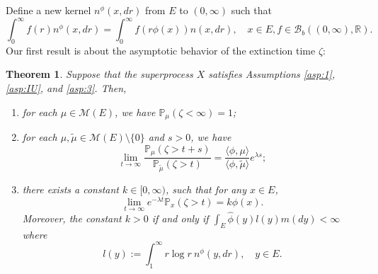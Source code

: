 \documentclass[12pt,a4paper]{amsart}
\numberwithin{equation}{section}
\theoremstyle{plain}
\newtheorem{thm}{Theorem}[section]
\theoremstyle{definition}
\begin{document}
\par
Define a new kernel $n^\phi(x, dr)$ from $E$ to $(0,\infty)$ such that
\begin{equation} \label{eq:phi_change}
	\int_0^\infty f(r)n^\phi(x,dr)=\int_0^\infty f(r\phi(x))n(x, dr),
	\quad x\in E, f\in \mathcal B_b((0,\infty), \mathbb R).
\end{equation}
Our first result is about the asymptotic behavior of the extinction time $\zeta$:

\begin{thm}\label{thm:distribution_of_zeta}
	Suppose that the superprocess $X$ satisfies Assumptions \ref{asp:1},
  \ref{asp:IU}, and \ref{asp:3}. Then,
  \begin{enumerate}
  \item
    \label{subthm:extinct_almost_sure}
    for each $\mu \in \mathcal M(E)$, we have  $\mathbb P_\mu(\zeta<\infty)=1$;
  \item
    for each $\mu,\widetilde\mu\in \mathcal M(E)\setminus\{0\}$ and $s>0$, we have
    \[
      \lim_{t\rightarrow\infty}\dfrac{\mathbb P_{\mu}(\zeta>t+s)}{\mathbb P_{\widetilde\mu}(\zeta>t)}=\frac{\langle \phi,\mu\rangle }{\langle \phi,\widetilde\mu\rangle }e^{\lambda s};
    \]
  \item
  \label{subthm:LlogL}
    there exists a constant $k\in [0,\infty)$, such that for any $x\in E$,
    \begin{equation}\label{eq:decay_rate}
      \lim_{t\rightarrow\infty} e^{-\lambda t}\mathbb P_x(\zeta>t)=k\phi(x).
    \end{equation}
    Moreover, the constant $k>0$ if and only if $\int_E \widehat\phi(y)l(y)m(dy)<\infty$ where
    \begin{equation}\label{eq:m}
      l(y):=\int_1^\infty r\log r~n^\phi(y, dr),\quad y \in E.
    \end{equation}
  \end{enumerate}
\end{thm}

\begin{comment}
In particular, for any $x,y\in E$ and $s\geq 0$, the second result in the above theorem can be written as
\begin{equation}\label{eq:ratio_result}
 	\lim_{t\rightarrow\infty}\frac{\mathbb P_x(\zeta>t+s)}{\mathbb P_y(\zeta>t)}=\frac{\phi(x)}{\phi(y)}e^{\lambda s}.
\end{equation}
So we can see that the effect of the position of the initial mass on the decay of the mass is a ratio of $\phi(\cdot)$ generally.
\end{comment}
\end{document}

